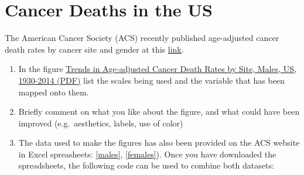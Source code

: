 \documentclass[letterpaper,9pt,twoside,printwatermark=false]{pinp}
\providecommand{\tightlist}{%
  \setlength{\itemsep}{0pt}\setlength{\parskip}{0pt}}
\begin{document}
\section{Cancer Deaths in the US}\label{cancer-deaths-in-the-us}

The American Cancer Society (ACS) recently published age-adjusted cancer
death rates by cancer site and gender at this
\href{https://www.cancer.org/research/cancer-facts-statistics/all-cancer-facts-figures/cancer-facts-figures-2017.html}{link}.

\begin{enumerate}
\def\labelenumi{\alph{enumi})}
\tightlist
\item
  In the figure
  \href{https://www.cancer.org/content/dam/cancer-org/research/cancer-facts-and-statistics/annual-cancer-facts-and-figures/2017/trends-in-age-adjusted-cancer-death-rates-by-site-males-us-1930-2014.pdf}{Trends
  in Age-adjusted Cancer Death Rates by Site, Males, US, 1930-2014
  (PDF)} list the scales being used and the variable that has been
  mapped onto them.
\item
  Briefly comment on what you like about the figure, and what could have
  been improved (e.g.~aesthetics, labels, use of color)
\item
  The data used to make the figures has also been provided on the ACS
  website in Excel spreasheets:
  \href{https://www.cancer.org/content/dam/cancer-org/research/cancer-facts-and-statistics/annual-cancer-facts-and-figures/2017/age-adjusted-cancer-death-rates-males-1930-2014.xlsx}{{[}males{]}},
  \href{https://www.cancer.org/content/dam/cancer-org/research/cancer-facts-and-statistics/annual-cancer-facts-and-figures/2017/age-adjusted-cancer-death-rates-females-1930-2014.xlsx}{{[}females{]}}).
  Once you have downloaded the spreadsheets, the following code can be
  used to combine both datasets:
\end{enumerate}

\begin{Shaded}
\end{Shaded}
\end{document}
